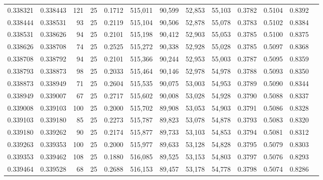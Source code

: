 \begin{tabular}{rrrrrrrrrrrrr}
0.338321 & 0.338443 &   121 &  25 &                                     0.1712 & 515,011 &  90,599 &  52,853 &  55,103 & 0.3782 & 0.5104 & 0.8392 \\
0.338444 & 0.338531 &    93 &  25 &                                     0.2119 & 515,104 &  90,506 &  52,878 &  55,078 & 0.3783 & 0.5102 & 0.8384 \\
0.338531 & 0.338626 &    94 &  25 &                                     0.2101 & 515,198 &  90,412 &  52,903 &  55,053 & 0.3785 & 0.5100 & 0.8375 \\
0.338626 & 0.338708 &    74 &  25 &                                     0.2525 & 515,272 &  90,338 &  52,928 &  55,028 & 0.3785 & 0.5097 & 0.8368 \\
0.338708 & 0.338792 &    94 &  25 &                                     0.2101 & 515,366 &  90,244 &  52,953 &  55,003 & 0.3787 & 0.5095 & 0.8359 \\
0.338793 & 0.338873 &    98 &  25 &                                     0.2033 & 515,464 &  90,146 &  52,978 &  54,978 & 0.3788 & 0.5093 & 0.8350 \\
0.338873 & 0.338949 &    71 &  25 &                                     0.2604 & 515,535 &  90,075 &  53,003 &  54,953 & 0.3789 & 0.5090 & 0.8344 \\
0.338949 & 0.339007 &    67 &  25 &                                     0.2717 & 515,602 &  90,008 &  53,028 &  54,928 & 0.3790 & 0.5088 & 0.8337 \\
0.339008 & 0.339103 &   100 &  25 &                                     0.2000 & 515,702 &  89,908 &  53,053 &  54,903 & 0.3791 & 0.5086 & 0.8328 \\
0.339103 & 0.339180 &    85 &  25 &                                     0.2273 & 515,787 &  89,823 &  53,078 &  54,878 & 0.3793 & 0.5083 & 0.8320 \\
0.339180 & 0.339262 &    90 &  25 &                                     0.2174 & 515,877 &  89,733 &  53,103 &  54,853 & 0.3794 & 0.5081 & 0.8312 \\
0.339263 & 0.339353 &   100 &  25 &                                     0.2000 & 515,977 &  89,633 &  53,128 &  54,828 & 0.3795 & 0.5079 & 0.8303 \\
0.339353 & 0.339462 &   108 &  25 &                                     0.1880 & 516,085 &  89,525 &  53,153 &  54,803 & 0.3797 & 0.5076 & 0.8293 \\
0.339464 & 0.339528 &    68 &  25 &                                     0.2688 & 516,153 &  89,457 &  53,178 &  54,778 & 0.3798 & 0.5074 & 0.8286 \\

\end{tabular}
